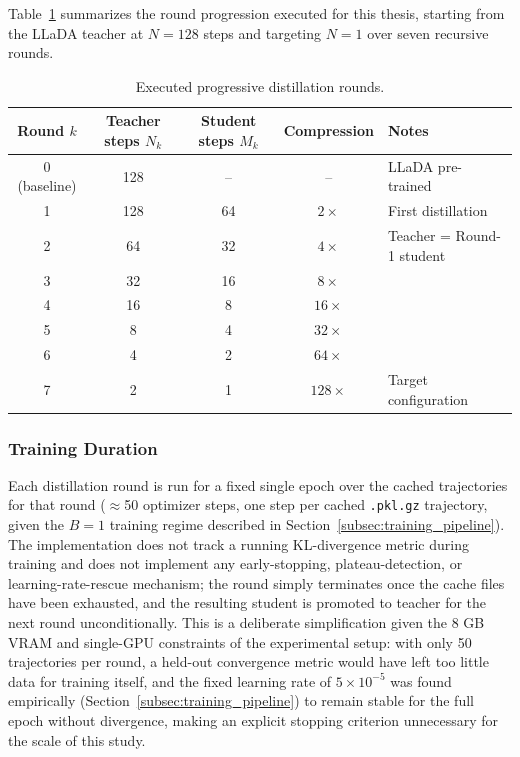 \documentclass[11pt, a4paper]{article}
\begin{document}
Table~\ref{tab:distillation_rounds} summarizes the round progression executed for this
thesis, starting from the LLaDA teacher at $N=128$ steps and targeting $N=1$ over
seven recursive rounds.

\begin{table}[H]
\centering
\caption{Executed progressive distillation rounds.}
\label{tab:distillation_rounds}
\begin{tabular}{@{}ccccl@{}}
\toprule
\textbf{Round} $k$ & \textbf{Teacher steps} $N_k$ & \textbf{Student steps} $M_k$ &
\textbf{Compression} & \textbf{Notes} \\ \midrule
0 (baseline) & 128 & -- & -- & LLaDA pre-trained \\
1            & 128 & 64 & $2\times$ & First distillation \\
2            & 64  & 32 & $4\times$ & Teacher = Round-1 student \\
3            & 32  & 16 & $8\times$ & \\
4            & 16  & 8  & $16\times$ & \\
5            & 8   & 4  & $32\times$ & \\
6            & 4   & 2  & $64\times$ & \\
7            & 2   & 1  & $128\times$ & Target configuration \\ \bottomrule
\end{tabular}
\end{table}

\subsubsection{Training Duration}
\label{subsubsec:convergence}

Each distillation round is run for a fixed single epoch over the cached trajectories
for that round ($\approx$50 optimizer steps, one step per cached \texttt{.pkl.gz}
trajectory, given the $B=1$ training regime described in
Section~\ref{subsec:training_pipeline}). The implementation does not track a running
KL-divergence metric during training and does not implement any early-stopping,
plateau-detection, or learning-rate-rescue mechanism; the round simply terminates
once the cache files have been exhausted, and the resulting student is promoted to
teacher for the next round unconditionally. This is a deliberate simplification
given the 8 GB VRAM and single-GPU constraints of the experimental setup: with only
50 trajectories per round, a held-out convergence metric would have left too little
data for training itself, and the fixed learning rate of $5\times10^{-5}$ was found
empirically (Section~\ref{subsec:training_pipeline}) to remain stable for the full
epoch without divergence, making an explicit stopping criterion unnecessary for the
scale of this study.
\end{document}

